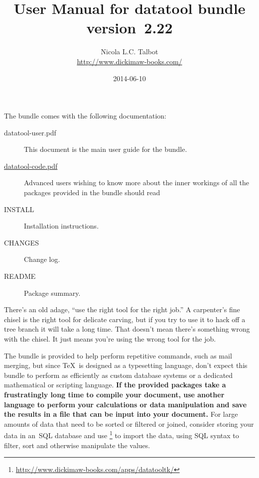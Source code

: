 \documentclass[report,widecs]{nlctdoc}
\begin{document}
\raggedright
\setlength{\parindent}{1em}%

\DeleteShortVerb{\|}

 \title{User Manual for datatool bundle version~2.22}
 \author{Nicola L.C. Talbot\\
\url{http://www.dickimaw-books.com/}}

 \date{2014-06-10}
 \maketitle


\noindent
The  bundle comes with the following documentation:
\begin{description}
  \item[datatool-user.pdf]
  This document is the main user guide for the 
  bundle.

  \item[\url{datatool-code.pdf}]
  Advanced users wishing to know more about the inner workings of
  all the packages provided in the  bundle should
  read 

  \item[INSTALL] Installation instructions.

  \item[CHANGES] Change log.

  \item[README] Package summary.
\end{description}

\begin{important}
There's an old adage, ``use the right tool for the right job.''
A carpenter's fine chisel is the right tool for delicate carving,
but if you try to use it to hack off a tree branch it will take a
long time. That doesn't mean there's something wrong with the
chisel. It just means you're using the wrong tool for the job.

The  bundle is provided to help perform repetitive
commands, such as mail merging, but since \TeX\ is designed as a
typesetting language, don't expect this bundle to perform as
efficiently as custom database systems or a dedicated mathematical
or scripting language. \textbf{If the provided packages take a frustratingly
long time to compile your document, use another language to perform
your calculations or data manipulation and save the results in a
file that can be input into your document.} For large amounts of
data that need to be sorted or filtered or joined, consider storing your data 
in an~SQL database and use
\footnote{\url{http://www.dickimaw-books.com/apps/datatooltk/}} to import the data, 
using SQL syntax to filter, sort and otherwise
manipulate the values.
\end{important}
\end{document}
